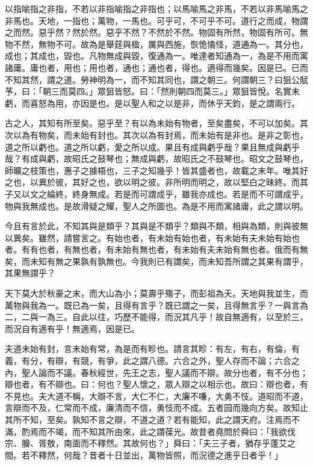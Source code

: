 \begin{pinyinscope}
以指喻指之非指，不若以非指喻指之非指也；以馬喻馬之非馬，不若以非馬喻馬之非馬也。天地，一指也；萬物，一馬也。可乎可，不可乎不可。道行之而成，物謂之而然。惡乎然？然於然。惡乎不然？不然於不然。物固有所然，物固有所可。無物不然，無物不可。故為是舉莛與楹，厲與西施，恢恑憰怪，道通為一。其分也，成也；其成也，毀也。凡物無成與毀，復通為一。唯達者知通為一，為是不用而寓諸庸。庸也者，用也；用也者，通也；通也者，得也。適得而幾矣。因是已。已而不知其然，謂之道。勞神明為一，而不知其同也，謂之朝三。何謂朝三？曰狙公賦芧，曰：「朝三而莫四。」眾狙皆怒。曰：「然則朝四而莫三。」眾狙皆悅。名實未虧，而喜怒為用，亦因是也。是以聖人和之以是非，而休乎天鈞，是之謂兩行。

古之人，其知有所至矣。惡乎至？有以為未始有物者，至矣盡矣，不可以加矣。其次以為有物矣，而未始有封也。其次以為有封焉，而未始有是非也。是非之彰也，道之所以虧也。道之所以虧，愛之所以成。果且有成與虧乎哉？果且無成與虧乎哉？有成與虧，故昭氏之鼓琴也；無成與虧，故昭氏之不鼓琴也。昭文之鼓琴也，師曠之枝策也，惠子之據梧也，三子之知幾乎！皆其盛者也，故載之末年。唯其好之也，以異於彼，其好之也，欲以明之彼。非所明而明之，故以堅白之昧終。而其子又以文之綸終，終身無成。若是而可謂成乎，雖我亦成也。若是而不可謂成乎，物與我無成也。是故滑疑之耀，聖人之所圖也。為是不用而寓諸庸，此之謂以明。

今且有言於此，不知其與是類乎？其與是不類乎？類與不類，相與為類，則與彼無以異矣。雖然，請嘗言之。有始也者，有未始有始也者，有未始有夫未始有始也者。有有也者，有無也者，有未始有無也者，有未始有夫未始有無也者。俄而有無矣，而未知有無之果孰有孰無也。今我則已有謂矣，而未知吾所謂之其果有謂乎，其果無謂乎？

天下莫大於秋豪之末，而大山為小；莫壽乎殤子，而彭祖為夭。天地與我並生，而萬物與我為一。既已為一矣，且得有言乎？既已謂之一矣，且得無言乎？一與言為二，二與一為三。自此以往，巧歷不能得，而況其凡乎！故自無適有，以至於三，而況自有適有乎！無適焉，因是已。

夫道未始有封，言未始有常，為是而有畛也。請言其畛：有左，有右，有倫，有義，有分，有辯，有競，有爭，此之謂八德。六合之外，聖人存而不論；六合之內，聖人論而不議。春秋經世，先王之志，聖人議而不辯。故分也者，有不分也；辯也者，有不辯也。曰：何也？聖人懷之，眾人辯之以相示也。故曰：辯也者，有不見也。夫大道不稱，大辯不言，大仁不仁，大廉不嗛，大勇不忮。道昭而不道，言辯而不及，仁常而不成，廉清而不信，勇忮而不成。五者园而幾向方矣。故知止其所不知，至矣。孰知不言之辯，不道之道？若有能知，此之謂天府。注焉而不滿，酌焉而不竭，而不知其所由來，此之謂葆光。故昔者堯問於舜曰：「我欲伐宗、膾、胥敖，南面而不釋然。其故何也？」舜曰：「夫三子者，猶存乎蓬艾之間。若不釋然，何哉？昔者十日並出，萬物皆照，而況德之進乎日者乎！」


\end{pinyinscope}
